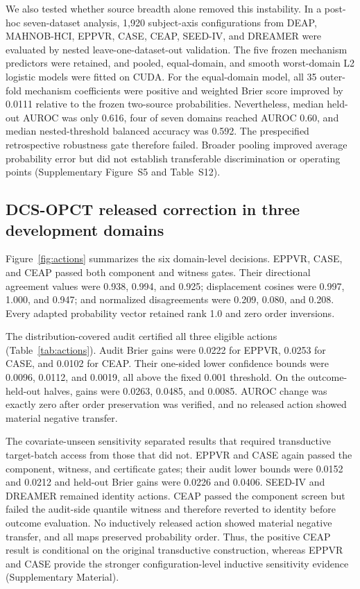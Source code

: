 \documentclass[preprint,12pt]{elsarticle}
\begin{document}
We also tested whether source breadth alone removed this instability. In a post-hoc seven-dataset analysis, 1,920 subject-axis configurations from DEAP, MAHNOB-HCI, EPPVR, CASE, CEAP, SEED-IV, and DREAMER were evaluated by nested leave-one-dataset-out validation. The five frozen mechanism predictors were retained, and pooled, equal-domain, and smooth worst-domain L2 logistic models were fitted on CUDA. For the equal-domain model, all 35 outer-fold mechanism coefficients were positive and weighted Brier score improved by 0.0111 relative to the frozen two-source probabilities. Nevertheless, median held-out AUROC was only 0.616, four of seven domains reached AUROC 0.60, and median nested-threshold balanced accuracy was 0.592. The prespecified retrospective robustness gate therefore failed. Broader pooling improved average probability error but did not establish transferable discrimination or operating points (Supplementary Figure~S5 and Table~S12).

\subsection{DCS-OPCT released correction in three development domains}

Figure~\ref{fig:actions} summarizes the six domain-level decisions. EPPVR, CASE, and CEAP passed both component and witness gates. Their directional agreement values were 0.938, 0.994, and 0.925; displacement cosines were 0.997, 1.000, and 0.947; and normalized disagreements were 0.209, 0.080, and 0.208. Every adapted probability vector retained rank 1.0 and zero order inversions.

The distribution-covered audit certified all three eligible actions (Table~\ref{tab:actions}). Audit Brier gains were 0.0222 for EPPVR, 0.0253 for CASE, and 0.0102 for CEAP. Their one-sided lower confidence bounds were 0.0096, 0.0112, and 0.0019, all above the fixed 0.001 threshold. On the outcome-held-out halves, gains were 0.0263, 0.0485, and 0.0085. AUROC change was exactly zero after order preservation was verified, and no released action showed material negative transfer.

The covariate-unseen sensitivity separated results that required transductive target-batch access from those that did not. EPPVR and CASE again passed the component, witness, and certificate gates; their audit lower bounds were 0.0152 and 0.0212 and held-out Brier gains were 0.0226 and 0.0406. SEED-IV and DREAMER remained identity actions. CEAP passed the component screen but failed the audit-side quantile witness and therefore reverted to identity before outcome evaluation. No inductively released action showed material negative transfer, and all maps preserved probability order. Thus, the positive CEAP result is conditional on the original transductive construction, whereas EPPVR and CASE provide the stronger configuration-level inductive sensitivity evidence (Supplementary Material).
\end{document}
